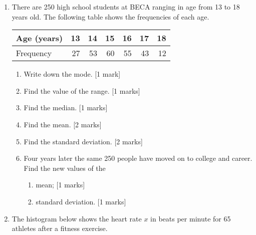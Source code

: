 \documentclass[12pt, twoside]{article}
\begin{document}
\begin{enumerate}
\newpage

  \item There are 250 high school students at BECA ranging in age from 13 to 18 years old. The following table shows the frequencies of each age.
    \begin{center}
    \begin{tabular}{|l|r|r|r|r|r|r|}
      \hline
      Age (years) & 13 & 14 & 15 & 16 & 17 & 18\\ 
      \hline 
      Frequency & 27 & 53 & 60 & 55 & 43 & 12\\ 
      \hline 
      \end{tabular}
    \end{center}

  \begin{enumerate}
    \item Write down the mode. \hfill [1 mark] \vspace{1.5cm}
    \item Find the value of the range. \hfill [1 marks] \vspace{1.5cm}
    \item Find the median. \hfill [1 marks] \vspace{1.5cm}
    \item Find the mean. \hfill [2 marks] \vspace{1.5cm}
    \item Find the standard deviation. \hfill [2 marks] \vspace{1.5cm}
    \item Four years later the same 250 people have moved on to college and career. Find the new values of the 
    \begin{enumerate}
      \item mean; \hfill [1 marks] \vspace{1.5cm}
      \item standard deviation. \hfill [1 marks]
    \end{enumerate}
  \end{enumerate}
    
\newpage
  \item The histogram below shows the heart rate $x$ in beats per minute for 65 athletes after a fitness exercise.


\end{enumerate}
\end{document}
